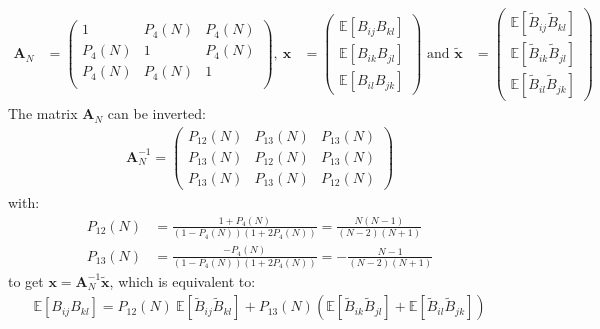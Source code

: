 \documentclass[12pt]{scrartcl}
\begin{document}
\begin{align}
\mathbf{A}_N & = \left( \begin{array}{ccc}
1 & P_4(N) & P_4(N) \\
P_4(N) & 1 & P_4(N) \\
P_4(N) & P_4(N) & 1 \\
\end{array} \right) , \
\mathbf{x} & = \left( \begin{array}{c}
\mathbb{E} \left[B_{ij} B_{kl}\right] \\
\mathbb{E} \left[B_{ik} B_{jl}\right] \\
\mathbb{E} \left[B_{il} B_{jk}\right]
\end{array} \right) \text{ and }
\widetilde{\mathbf{x}} & = \left( \begin{array}{c}
\mathbb{E} \left[\widetilde{B}_{ij} \widetilde{B}_{kl}\right] \\
\mathbb{E} \left[\widetilde{B}_{ik} \widetilde{B}_{jl}\right] \\
\mathbb{E} \left[\widetilde{B}_{il} \widetilde{B}_{jk}\right]
\end{array} \right) \nonumber
\end{align}
The matrix $\mathbf{A}_N$ can be inverted:
\begin{align}
\label{eq:invert_lin_sys_gau}
\mathbf{A}_N^{-1} = \left( \begin{array}{ccc}
P_{12}(N) & P_{13}(N) & P_{13}(N) \\
P_{13}(N) & P_{12}(N) & P_{13}(N) \\
P_{13}(N) & P_{13}(N) & P_{12}(N)
\end{array} \right)
\end{align}
with:
\begin{subequations}
\begin{align}
P_{12}(N) & = \frac{1 + P_4(N)}{\left(1 - P_4(N)\right)\left(1 + 2P_4(N)\right)} = \frac{N(N-1)}{(N-2)(N+1)} \\
P_{13}(N) & = \frac{-P_4(N)}{\left(1 - P_4(N)\right)\left(1 + 2P_4(N)\right)} = -\frac{N-1}{(N-2)(N+1)}
\end{align}
\end{subequations}
to get $\mathbf{x} = \mathbf{A}_N^{-1} \widetilde{\mathbf{x}}$, which is equivalent to:
\begin{align}
\label{eq:prod_asy_cov_gau}
\mathbb{E} \left[B_{ij} B_{kl}\right] = P_{12}(N) \ \mathbb{E} \left[\widetilde{B}_{ij} \widetilde{B}_{kl}\right] + P_{13}(N) \left(\mathbb{E} \left[\widetilde{B}_{ik} \widetilde{B}_{jl}\right] + \mathbb{E} \left[\widetilde{B}_{il} \widetilde{B}_{jk}\right]\right)
\end{align}
\end{document}

